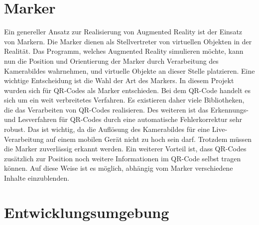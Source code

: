 \section{Marker}
Ein genereller Ansatz zur Realisierung von Augmented Reality ist der Einsatz von Markern. Die Marker dienen als Stellvertreter von virtuellen Objekten in der Realität. Das Programm, welches Augmented Reality simulieren möchte, kann nun die Position und Orientierung der Marker durch Verarbeitung des Kamerabildes wahrnehmen, und virtuelle Objekte an dieser Stelle platzieren.
Eine wichtige Entscheidung ist die Wahl der Art des Markers. In diesem Projekt wurden sich für QR-Codes als Marker entschieden.
Bei dem QR-Code handelt es sich um ein weit verbreitetes Verfahren. Es existieren daher viele Bibliotheken, die das Verarbeiten von QR-Codes realisieren. Des weiteren ist das Erkennungs- und Lesverfahren für QR-Codes durch eine automatische Fehlerkorrektur sehr robust. Das ist wichtig, da die Auflösung des Kamerabildes für eine Live-Verarbeitung auf einem mobilen Gerät nicht zu hoch sein darf. Trotzdem müssen die Marker zuverlässig erkannt werden. Ein weiterer Vorteil ist, dass QR-Codes zusätzlich zur Position noch weitere Informationen im QR-Code selbst tragen können. Auf diese Weise ist es möglich, abhängig vom Marker verschiedene Inhalte einzublenden.

\section{Entwicklungsumgebung}
